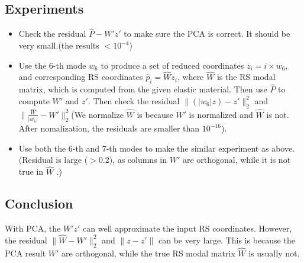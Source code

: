 \documentclass[twocolumn,a4paper]{article}
\begin{document}
\subsection{Experiments}
\begin{itemize}
\item Check the residual $\hat{P}-W'z'$ to make sure the PCA is correct. It
  should be very small.({\color{red}the results $<10^{-4}$})
\item Use the 6-th mode $w_6$ to produce a set of reduced coordinates
  $z_i=i\times w_6$, and corresponding RS coordinates $\hat{p}_i=\hat{W}z_i$,
  where $\hat{W}$ is the RS modal matrix, which is computed from the given
  elastic material. Then use $\hat{P}$ to compute $W'$ and $z'$. Then check the
  residual $\|(|w_6|z)-z'\|_2^2$ and
  $\|\frac{\hat{W}}{|w_6|}-W'\|_2^2$({\color{red}We normalize $\hat{W}$ is
    because $W'$ is normalized and $\hat{W}$ is not. After nomalization, the
    residuals are smaller than $10^{-16}$}).
\item Use both the 6-th and 7-th modes to make the similar experiment as
  above.({\color{red}Residual is large ($>0.2$), as columns in $W'$ are
    orthogonal, while it is not true in $\hat{W}$ .})
\end{itemize}

\subsection{Conclusion}
With PCA, the $W'z'$ can well approximate the input RS coordinates. However, the
residual $\|\hat{W}-W'\|_2^2$ and $\|z-z'\|$ can be very large. This is because
the PCA result $W'$ are orthogonal, while the true RS modal matrix $\hat{W}$ is
usually not.
\end{document}
